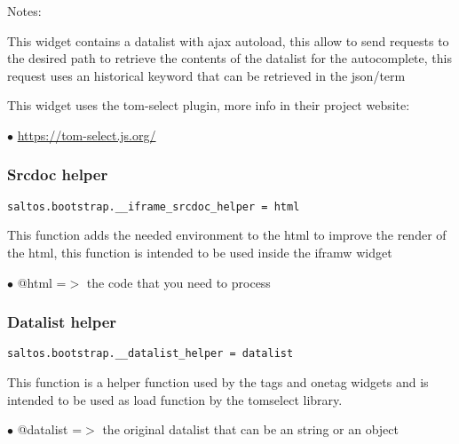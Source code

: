 \documentclass[a4paper]{article}
\def\htmladdnormallink#1#2{\href{#2}{#1}}
\begin{document}
Notes:

This widget contains a datalist with ajax autoload, this allow to send requests
to the desired path to retrieve the contents of the datalist for the autocomplete,
this request uses an historical keyword that can be retrieved in the json/term

This widget uses the tom-select plugin, more info in their project website:

\begin{compactitem}
\item[\color{myblue}$\bullet$] \htmladdnormallink{https://tom-select.js.org/}{https://tom-select.js.org/}
\end{compactitem}

\hypertarget{toc639}{}
\subsubsection{Srcdoc helper}

\begin{lstlisting}
saltos.bootstrap.__iframe_srcdoc_helper = html
\end{lstlisting}

This function adds the needed environment to the html to improve the
render of the html, this function is intended to be used inside the
iframw widget

\begin{compactitem}
\item[\color{myblue}$\bullet$] @html =$>$ the code that you need to process
\end{compactitem}

\hypertarget{toc640}{}
\subsubsection{Datalist helper}

\begin{lstlisting}
saltos.bootstrap.__datalist_helper = datalist
\end{lstlisting}

This function is a helper function used by the tags and onetag widgets
and is intended to be used as load function by the tomselect library.

\begin{compactitem}
\item[\color{myblue}$\bullet$] @datalist =$>$ the original datalist that can be an string or an object
\end{compactitem}
\end{document}
